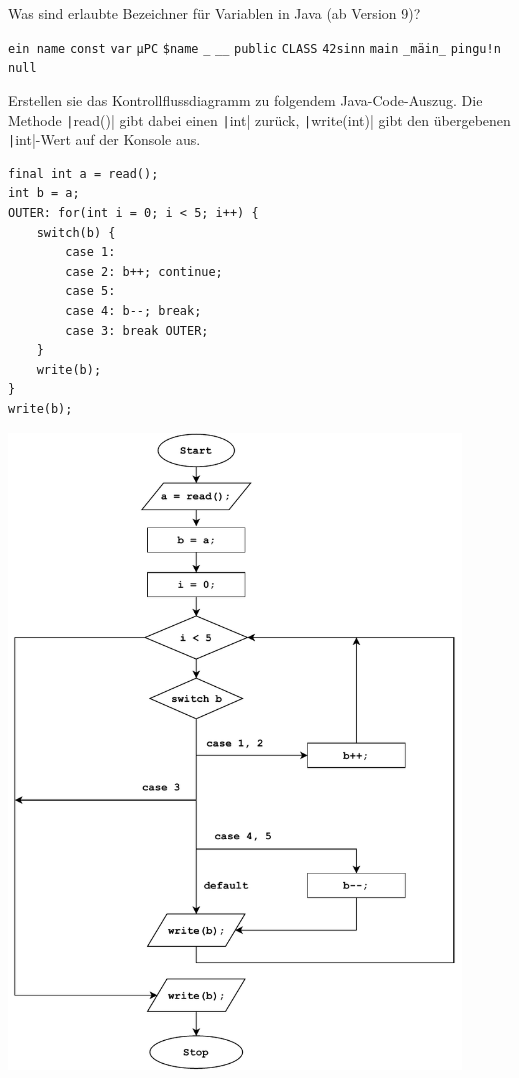 \documentclass[11pt]{exam} %
\newcommand{\code}[1]{\texttt|#1|}
\newcommand{\fillinline}[1]{\ifprintanswers\fillin[\code{#1}][3cm]\fi\xrfill[-1pt]{0.2mm}}
\begin{document}
\begin{questions}
\question Was sind erlaubte Bezeichner für Variablen in Java (ab Version 9)?
\begin{checkboxes}
\choice \texttt{ein name}
\CorrectChoice \texttt{const}
\CorrectChoice \texttt{var}
\CorrectChoice \texttt{µPC}
\CorrectChoice \texttt{\$name}
\choice \texttt{\_}
\CorrectChoice \texttt{\_\_}
\choice \texttt{public}
\CorrectChoice \texttt{CLASS}
\choice \texttt{42sinn}
\CorrectChoice \texttt{main}
\CorrectChoice \texttt{\_mäin\_}
\choice \texttt{pingu!n}
\choice \texttt{null}
\end{checkboxes}
\question Erstellen sie das Kontrollflussdiagramm zu folgendem Java-Code-Auszug. Die Methode \code{read()} gibt dabei einen \code{int} zurück, \code{write(int)} gibt den übergebenen \code{int}-Wert auf der Konsole aus.
\begin{verbatim}
final int a = read();
int b = a;
OUTER: for(int i = 0; i < 5; i++) {
	switch(b) {
		case 1:
		case 2: b++; continue;
		case 5:
		case 4: b--; break;
		case 3: break OUTER;
	}
	write(b);
}
write(b);
\end{verbatim}
\begin{solution}
\includegraphics[width=12cm]{kontrollfluss.pdf}
\end{solution}

\end{questions}
\end{document}
